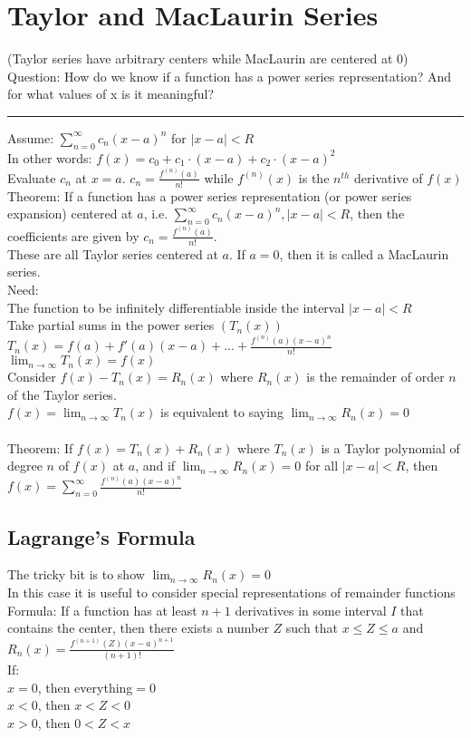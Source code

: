 \documentclass{article}
\begin{document}
\section{Taylor and MacLaurin Series}
(Taylor series have arbitrary centers while MacLaurin are centered at 0)\\
Question: How do we know if a function has a power series representation? And for what values of x is it meaningful?\\
\hrule
Assume: $\displaystyle \sum^\infty_{n=0}c_n(x-a)^n$ for $|x-a|<R$\\
In other words: $f(x)=c_0+c_1 \cdot (x-a) + c_2 \cdot (x-a)^2$\\
Evaluate $c_n$ at $x=a$. $c_n=\frac{f^{(n)}(a)}{n!}$ while $f^{(n)}(x)$ is the $n^{th}$ derivative of $f(x)$\\
Theorem: If a function has a power series representation (or power series expansion) centered at $a$, i.e. $\displaystyle \sum^\infty_{n=0}c_n(x-a)^n, |x-a|<R$, then the coefficients are given by $c_n=\frac{f^{(n)}(a)}{n!}$.\\
These are all Taylor series centered at $a$. If $a=0$, then it is called a MacLaurin series.\\
Need:\\
\indent The function to be infinitely differentiable inside the interval $|x-a|<R$\\
\indent Take partial sums in the power series $(T_n(x))$\\
\indent \indent $T_n(x)=f(a)+f'(a)(x-a)+...+\frac{f^{(n)}(a)(x-a)^n}{n!}$\\
\indent $\displaystyle \lim_{n\to\infty}T_n(x)=f(x)$\\
Consider $f(x)-T_n(x)=R_n(x)$ where $R_n(x)$ is the remainder of order $n$ of the Taylor series.\\
$\displaystyle f(x)=\lim_{n\to\infty}T_n(x)$ is equivalent to saying $\displaystyle \lim_{n\to\infty}R_n(x)=0$\\\\
Theorem: If $f(x)=T_n(x)+R_n(x)$ where $T_n(x)$ is a Taylor polynomial of degree $n$ of $f(x)$ at $a$, and if $\displaystyle \lim_{n\to\infty}R_n(x)=0$ for all $|x-a|<R$, then $\displaystyle f(x)=\sum^\infty_{n=0}\frac{f^{(n)}(a)(x-a)^n}{n!}$
\subsection*{Lagrange's Formula}
The tricky bit is to show $\displaystyle \lim_{n\to\infty}R_n(x)=0$\\
In this case it is useful to consider special representations of remainder functions\\
Formula: If a function has at least $n+1$ derivatives in some interval $I$ that contains the center, then there exists a number $Z$ such that $x\le Z\le a$ and $R_n(x)=\frac{f^{(n+1)}(Z)(x-a)^{n+1} }{(n+1)!}$\\
If:\\
\indent $x=0$, then everything$=0$\\
\indent $x<0$, then $x<Z<0$\\
\indent $x>0$, then $0<Z<x$\\
\end{document}

